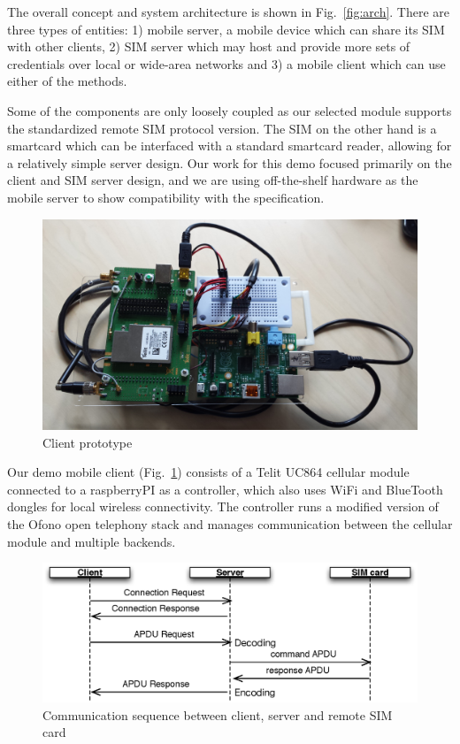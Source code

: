 \documentclass{sig-alternate-10pt}
\begin{document}
The overall concept and system architecture is shown in Fig.~\ref{fig:arch}. There are three types of entities: 1) mobile server, a mobile device which can share its SIM with other clients, 2) SIM server which may host and provide more sets of credentials over local or wide-area networks and 3) a mobile client which can use either of the methods.

Some of the components are only loosely coupled as our selected module supports the standardized remote SIM protocol version. The SIM on the other hand is a smartcard which can be interfaced with a standard smartcard reader, allowing for a relatively simple server design. Our work for this demo focused primarily on the client and SIM server design, and we are using off-the-shelf hardware as the mobile server to show compatibility with the specification.

\begin{figure}[t!]
\centering
\includegraphics[width=0.9\columnwidth]{figs/client}
\vspace{-2mm}
\caption{Client prototype}
\label{fig:client}
\vspace{-3mm}
\end{figure}

Our demo mobile client (Fig.~\ref{fig:client}) consists of a Telit UC864 cellular module connected to a raspberryPI as a controller, which also uses WiFi and BlueTooth dongles for local wireless connectivity. The controller runs a modified version of the Ofono open telephony stack and manages communication between the cellular module and multiple backends.

\begin{figure}[t!]
\centering
\includegraphics[width=0.9\columnwidth]{figs/sequence}
\vspace{-2mm}
\caption{Communication sequence between client, server and remote SIM card}
\label{fig:sequence}
\vspace{-4mm}
\end{figure}
\end{document}
